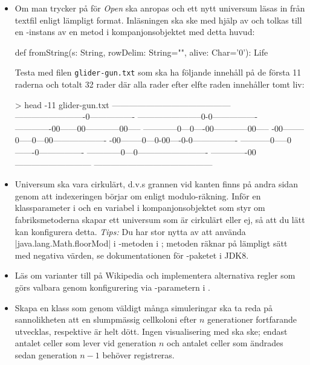 \begin{itemize}[nosep, label={$\square$}]
\item Om man trycker på  för \emph{Open} ska  anropas och ett nytt universum läsas in från textfil enligt lämpligt format. Inläsningen ska ske med hjälp av  och tolkas till en -instans av en metod i kompanjonsobjektet med detta huvud:
\begin{CodeSmall}
def fromString(s: String, rowDelim: String="\n", alive: Char='0'): Life
\end{CodeSmall}
Testa med filen \texttt{glider-gun.txt} som ska ha följande innehåll på de första 11 raderna och totalt 32 rader där alla rader efter elfte raden innehåller tomt liv:
\begin{REPLnonum}
> head -11 glider-gun.txt
------------------------------------------
-------------------------0----------------
-----------------------0-0----------------
-------------00------00------------00-----
------------0---0----00------------00-----
-00--------0-----0---00-------------------
-00--------0---0-00----0-0----------------
-----------0-----0-------0----------------
------------0---0-------------------------
-------------00---------------------------
------------------------------------------
\end{REPLnonum}
\item Universum ska vara cirkulärt, d.v.s grannen vid kanten finns på andra sidan genom att indexeringen börjar om  enligt modulo-räkning. Inför en klassparameter  i  och en variabel  i kompanjonsobjektet  som styr om fabriksmetoderna skapar ett universum som är cirkulärt eller ej, så att du lätt kan konfigurera detta. \emph{Tips:} Du har stor nytta av att använda \code|java.lang.Math.floorMod| i -metoden i ; metoden  räknar på lämpligt sätt med negativa värden, se dokumentationen för -paketet i JDK8.

\item Läs om varianter till  på Wikipedia och implementera alternativa regler som görs valbara genom konfigurering via -parametern i .

\item Skapa en klass  som genom väldigt många simuleringar ska ta reda på sannolikheten att en slumpmässig cellkoloni efter $n$ generationer fortfarande utvecklas, respektive är helt dött. Ingen visualisering med  ska ske; endast antalet celler som lever vid generation $n$ och antalet celler som ändrades sedan generation $n - 1$ behöver registreras.

\end{itemize}




